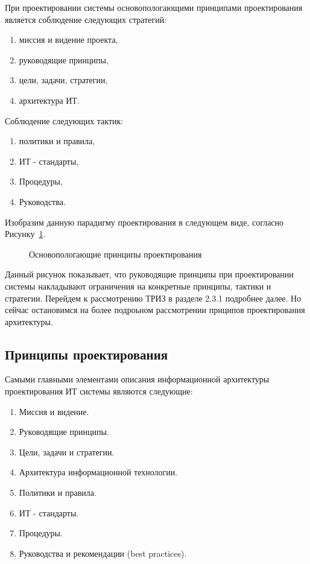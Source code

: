 При проектировании системы основопологающими принципами проектирования является соблюдение следующих стратегий:
\begin{enumerate}
	\item миссия и видение проекта,
	\item руководящие принципы,
	\item цели, задачи, стратегии,
	\item архитектура ИТ.
\end{enumerate}

Соблюдение следующих тактик:
\begin{enumerate}
	\item политики и правила,
	\item ИТ - стандарты,
	\item Процедуры,
	\item Руководства.
\end{enumerate}

Изобразим данную парадигму проектирования в следующем виде, согласно Рисунку~\cref{fig:StrategyM}.
\begin{figure}[ht1]
    \caption{Основопологающие принципы проектирования}\label{fig:StrategyM}
\end{figure}

Данный рисунок показывает, что руководящие принципы при проектировании системы накладывают ограничения на конкретные принципы, тактики и стратегии. Перейдем к рассмотрению ТРИЗ в разделе 2.3.1 подробнее далее. Но сейчас остановимся на более подроьном рассмотрении приципов проектирования архитектуры. 
\subsection{Принципы проектирования}\label{sec:ch2/sec1/sub11}
 Самыми главными элементами описания информационной архитектуры проектирования ИТ системы являются следующие:
 \begin{enumerate}
 	\item Миссия и видение.
 	\item Руководящие принципы.
 	\item Цели, задачи и стратегии.
 	\item Архитектура информационной технологии.
 	\item Политики и правила.
 	\item ИТ - стандарты.
 	\item Процедуры.
 	\item Руководства и рекомендации (best practices).
\end{enumerate}

